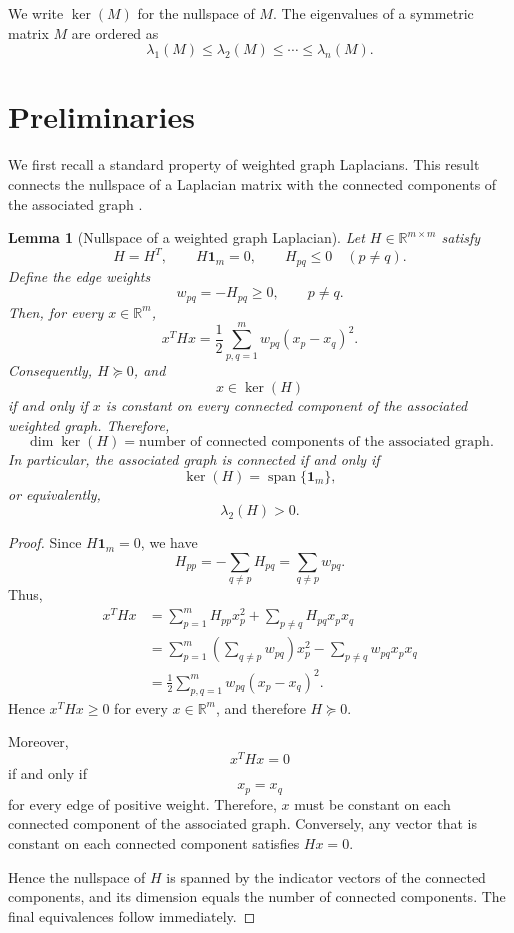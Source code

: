 \documentclass[11pt]{article}
\newtheorem{lemma}[theorem]{Lemma}
\begin{document}
We write $\ker(M)$ for the nullspace of $M$. The eigenvalues of a symmetric matrix $M$ are ordered as
\[
\lambda_1(M)\le \lambda_2(M)\le\cdots\le \lambda_n(M).
\]
	
	\section{Preliminaries}
	
	We first recall a standard property of weighted graph Laplacians. This result connects the nullspace of a Laplacian matrix with the connected components of the associated graph \cite{Chung1997, Biggs1993, Bapat2010, Merris1994}.
	
	\begin{lemma}[Nullspace of a weighted graph Laplacian]
		Let $H\in\mathbb R^{m\times m}$ satisfy
		$$
		H=H^T,\qquad H\mathbf 1_m=0,\qquad H_{pq}\le 0
		\quad (p\ne q).
		$$
		Define the edge weights
		$$
		w_{pq}=-H_{pq}\ge0,\qquad p\ne q.
		$$
		Then, for every $x\in\mathbb R^m$,
		$$
		x^THx
		=
		\frac12\sum_{p,q=1}^{m}w_{pq}(x_p-x_q)^2.
		$$
		Consequently, $H\succeq0$, and
		$$
		x\in\ker(H)
		$$
		if and only if $x$ is constant on every connected component of the associated weighted graph. Therefore,
		$$
		\dim\ker(H)
		=
		\text{number of connected components of the associated graph}.
		$$
		In particular, the associated graph is connected if and only if
		$$
		\ker(H)=\operatorname{span}\{\mathbf 1_m\},
		$$
		or equivalently,
		$$
		\lambda_2(H)>0.
		$$
	\end{lemma}
	
	\begin{proof}
		Since $H\mathbf 1_m=0$, we have
		$$
		H_{pp}
		=
		-\sum_{q\ne p}H_{pq}
		=
		\sum_{q\ne p}w_{pq}.
		$$
		Thus,
		$$
		\begin{aligned}
			x^THx
			&=
			\sum_{p=1}^{m}H_{pp}x_p^2
			+
			\sum_{p\ne q}H_{pq}x_px_q\\
			&=
			\sum_{p=1}^{m}
			\left(\sum_{q\ne p}w_{pq}\right)x_p^2
			-
			\sum_{p\ne q}w_{pq}x_px_q\\
			&=
			\frac12\sum_{p,q=1}^{m}
			w_{pq}(x_p-x_q)^2.
		\end{aligned}
		$$
		Hence $x^THx\ge0$ for every $x\in\mathbb R^m$, and therefore $H\succeq0$.
		
		Moreover,
		$$
		x^THx=0
		$$
		if and only if
		$$
		x_p=x_q
		$$
		for every edge of positive weight. Therefore, $x$ must be constant on each connected component of the associated graph. Conversely, any vector that is constant on each connected component satisfies $Hx=0$.
		
		Hence the nullspace of $H$ is spanned by the indicator vectors of the connected components, and its dimension equals the number of connected components. The final equivalences follow immediately.
	\end{proof}
	
\end{document}
